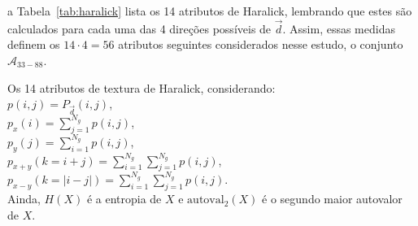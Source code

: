 \noindent a Tabela~\ref{tab:haralick} lista os 14 atributos de Haralick,
lembrando que estes são calculados para cada uma das 4 direções possíveis de
$\vec{d}$. Assim, essas medidas definem os $14 \cdot 4 = 56$ atributos seguintes
considerados nesse estudo, o conjunto $\mathcal{A}_{33-88}$.

\begin{table}
  \begin{center}
  \caption{\label{tab:haralick}Os 14 atributos de textura de Haralick,
    considerando: \\ $p(i,j) = P_{\vec{d}}(i,j)$, \\ $p_x(i) = \sum_{j=1}^{N_g}
    p(i,j)$, \\ $p_y(j) = \sum_{i=1}^{N_g} p(i,j)$, \\ $p_{x+y}(k=i+j) =
    \sum_{i=1}^{N_g}\sum_{j=1}^{N_g} p(i,j)$,  \\ $p_{x-y}(k=|i-j|) =
    \sum_{i=1}^{N_g}\sum_{j=1}^{N_g} p(i,j)$. \\ Ainda, $H(X)$ é a entropia de $X$
    e $\text{autoval}_2(X)$ é o segundo maior autovalor de $X$.}


\end{center}
\end{table}
